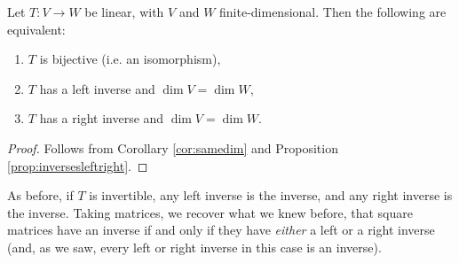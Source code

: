 \documentclass[../linear_algebra_and_groups.tex]{subfiles}
\begin{document}
\begin{corollary}
    \begin{shaded*}
        Let $T:V\to W$ be linear, with $V$ and $W$ finite-dimensional. Then the following are equivalent:
        \begin{enumerate}
            \item[1.] $T$ is bijective (i.e. an isomorphism),
            \item[2.] $T$ has a left inverse and $\dim V=\dim W$,
            \item[3.] $T$ has a right inverse and $\dim V=\dim W$.
        \end{enumerate}
    \end{shaded*}
\end{corollary}
\begin{proof}
    Follows from Corollary \ref{cor:samedim} and Proposition \ref{prop:inversesleftright}.\qedhere
\end{proof}
\begin{remark}
    As before, if $T$ is invertible, any left inverse is the inverse, and any right inverse is the inverse. Taking matrices, we recover what we knew before, that square matrices have an inverse if and only if they have \textit{either} a left or a right inverse (and, as we saw, every left or right inverse in this case is an inverse).
\end{remark}
\end{document}
